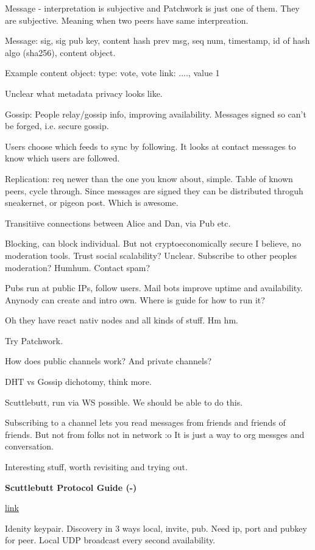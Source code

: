 \documentclass[12pt]{report}
\newcommand{\link}[2]{\href{#1}{#2}}
\begin{document}
Message - interpretation is subjective and Patchwork is just one of them. They
are subjective. Meaning when two peers have same interpreation.

Message: sig, sig pub key, content hash prev msg, seq num, timestamp, id of hash
algo (sha256), content object.

Example content object: {type: vote, vote {link: ...., value 1}}

Unclear what metadata privacy looks like.

Gossip: People relay/gossip info, improving availability. Messages signed so
can't be forged, i.e. secure gossip.

Users choose which feeds to sync by following. It looks at contact messages to
know which users are followed.

Replication: req newer than the one you know about, simple. Table of known
peers, cycle through. Since messages are signed they can be distributed throguh
sneakernet, or pigeon post. Which is awesome.

Transitiive connections between Alice and Dan, via Pub etc.

Blocking, can block individual. But not cryptoeconomically secure I believe, no
moderation tools. Trust social scalability? Unclear. Subscribe to other peoples
moderation? Humhum. Contact spam?

Pubs run at public IPs, follow users. Mail bots improve uptime and availability.
Anynody can create and intro own. Where is guide for how to run it?

Oh they have react nativ nodes and all kinds of stuff. Hm hm.

Try Patchwork.

How does public channels work? And private channels?

DHT vs Gossip dichotomy, think more.

Scuttlebutt, run via WS possible. We should be able to do this.

Subscribing to a channel lets you read messages from friends and friends of
friends. But not from folks not in network :o It is just a way to org messges
and conversation.

Interesting stuff, worth revisiting and trying out.

\textbf{Scuttlebutt Protocol Guide (-)}

\link{https://ssbc.github.io/scuttlebutt-protocol-guide/}{link}

Idenity keypair. Discovery in 3 ways local, invite, pub. Need ip, port and
pubkey for peer. Local UDP broadcast every second availability.
\end{document}
